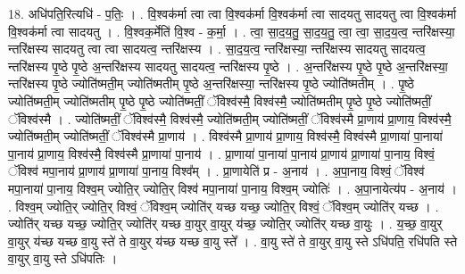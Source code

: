 \documentclass[17pt]{extarticle}
\begin{document}
18. अधि॑पति॒रित्यधि॑ - प॒तिः॒ । . वि॒श्वक॑र्मा त्वा त्वा वि॒श्वक॑र्मा वि॒श्वक॑र्मा त्वा सादयतु सादयतु त्वा वि॒श्वक॑र्मा वि॒श्वक॑र्मा त्वा सादयतु । . वि॒श्वक॒र्मेति॑ वि॒श्व - क॒र्मा॒ । . त्वा॒ सा॒द॒य॒तु॒ सा॒द॒य॒तु॒ त्वा॒ त्वा॒ सा॒द॒य॒त्व॒ न्तरि॑क्षस्या॒ न्तरि॑क्षस्य सादयतु त्वा त्वा सादयत्व॒ न्तरि॑क्षस्य । . सा॒द॒य॒त्व॒ न्तरि॑क्षस्या॒ न्तरि॑क्षस्य सादयतु सादयत्व॒ न्तरि॑क्षस्य पृ॒ष्ठे पृ॒ष्ठे अ॒न्तरि॑क्षस्य सादयतु सादयत्व॒ न्तरि॑क्षस्य पृ॒ष्ठे । . अ॒न्तरि॑क्षस्य पृ॒ष्ठे पृ॒ष्ठे अ॒न्तरि॑क्षस्या॒ न्तरि॑क्षस्य पृ॒ष्ठे ज्योति॑ष्मती॒म् ज्योति॑ष्मतीम् पृ॒ष्ठे अ॒न्तरि॑क्षस्या॒ न्तरि॑क्षस्य पृ॒ष्ठे ज्योति॑ष्मतीम् । . पृ॒ष्ठे ज्योति॑ष्मती॒म् ज्योति॑ष्मतीम् पृ॒ष्ठे पृ॒ष्ठे ज्योति॑ष्मतीं॒ ॅविश्व॑स्मै॒ विश्व॑स्मै॒ ज्योति॑ष्मतीम् पृ॒ष्ठे पृ॒ष्ठे ज्योति॑ष्मतीं॒ ॅविश्व॑स्मै । . ज्योति॑ष्मतीं॒ ॅविश्व॑स्मै॒ विश्व॑स्मै॒ ज्योति॑ष्मती॒म् ज्योति॑ष्मतीं॒ ॅविश्व॑स्मै प्रा॒णाय॑ प्रा॒णाय॒ विश्व॑स्मै॒ ज्योति॑ष्मती॒म् ज्योति॑ष्मतीं॒ ॅविश्व॑स्मै प्रा॒णाय॑ । . विश्व॑स्मै प्रा॒णाय॑ प्रा॒णाय॒ विश्व॑स्मै॒ विश्व॑स्मै प्रा॒णाया॑ पा॒नाया॑ पा॒नाय॑ प्रा॒णाय॒ विश्व॑स्मै॒ विश्व॑स्मै प्रा॒णाया॑ पा॒नाय॑ । . प्रा॒णाया॑ पा॒नाया॑ पा॒नाय॑ प्रा॒णाय॑ प्रा॒णाया॑ पा॒नाय॒ विश्वं॒ ॅविश्व॑ मपा॒नाय॑ प्रा॒णाय॑ प्रा॒णाया॑ पा॒नाय॒ विश्व᳚म् । . प्रा॒णायेति॑ प्र - अ॒नाय॑ । . अ॒पा॒नाय॒ विश्वं॒ ॅविश्व॑ मपा॒नाया॑ पा॒नाय॒ विश्व॒म् ज्योति॒र् ज्योति॒र् विश्व॑ मपा॒नाया॑ पा॒नाय॒ विश्व॒म् ज्योतिः॑ । . अ॒पा॒नायेत्य॑प - अ॒नाय॑ । . विश्व॒म् ज्योति॒र् ज्योति॒र् विश्वं॒ ॅविश्व॒म् ज्योति॑र् यच्छ यच्छ॒ ज्योति॒र् विश्वं॒ ॅविश्व॒म् ज्योति॑र् यच्छ । . ज्योति॑र् यच्छ यच्छ॒ ज्योति॒र् ज्योति॑र् यच्छ वा॒युर् वा॒युर् य॑च्छ॒ ज्योति॒र् ज्योति॑र् यच्छ वा॒युः । . य॒च्छ॒ वा॒युर् वा॒युर् य॑च्छ यच्छ वा॒यु स्ते॑ ते वा॒युर् य॑च्छ यच्छ वा॒यु स्ते᳚ । . वा॒यु स्ते॑ ते वा॒युर् वा॒यु स्ते ऽधि॑पति॒ रधि॑पति स्ते वा॒युर् वा॒यु स्ते ऽधि॑पतिः । \newline
\end{document}

